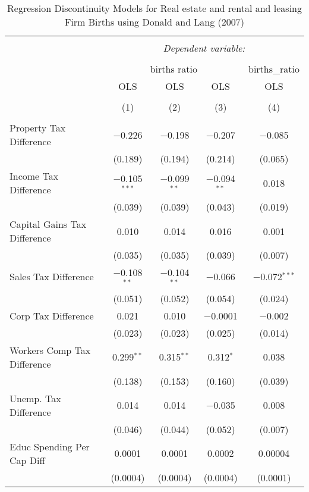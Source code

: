 
\begin{table}[!htbp] \centering 
  \caption{Regression Discontinuity Models for  Real estate and rental and leasing Firm Births using Donald and Lang (2007)} 
  \label{} 
\begin{tabular}{@{\extracolsep{5pt}}lcccc} 
\\[-1.8ex]\hline 
\hline \\[-1.8ex] 
 & \multicolumn{4}{c}{\textit{Dependent variable:}} \\ 
\cline{2-5} 
\\[-1.8ex] & \multicolumn{3}{c}{births ratio} & births\_ratio \\ 
 & OLS & OLS & OLS & OLS \\ 
\\[-1.8ex] & (1) & (2) & (3) & (4)\\ 
\hline \\[-1.8ex] 
 Property Tax Difference & $-$0.226 & $-$0.198 & $-$0.207 & $-$0.085 \\ 
  & (0.189) & (0.194) & (0.214) & (0.065) \\ 
  Income Tax Difference & $-$0.105$^{***}$ & $-$0.099$^{**}$ & $-$0.094$^{**}$ & 0.018 \\ 
  & (0.039) & (0.039) & (0.043) & (0.019) \\ 
  Capital Gains Tax Difference & 0.010 & 0.014 & 0.016 & 0.001 \\ 
  & (0.035) & (0.035) & (0.039) & (0.007) \\ 
  Sales Tax Difference & $-$0.108$^{**}$ & $-$0.104$^{**}$ & $-$0.066 & $-$0.072$^{***}$ \\ 
  & (0.051) & (0.052) & (0.054) & (0.024) \\ 
  Corp Tax Difference & 0.021 & 0.010 & $-$0.0001 & $-$0.002 \\ 
  & (0.023) & (0.023) & (0.025) & (0.014) \\ 
  Workers Comp Tax Difference & 0.299$^{**}$ & 0.315$^{**}$ & 0.312$^{*}$ & 0.038 \\ 
  & (0.138) & (0.153) & (0.160) & (0.039) \\ 
  Unemp. Tax Difference & 0.014 & 0.014 & $-$0.035 & 0.008 \\ 
  & (0.046) & (0.044) & (0.052) & (0.007) \\ 
  Educ Spending Per Cap Diff & 0.0001 & 0.0001 & 0.0002 & 0.00004 \\ 
  & (0.0004) & (0.0004) & (0.0004) & (0.0001) \\ 

\end{tabular}
\end{table}
